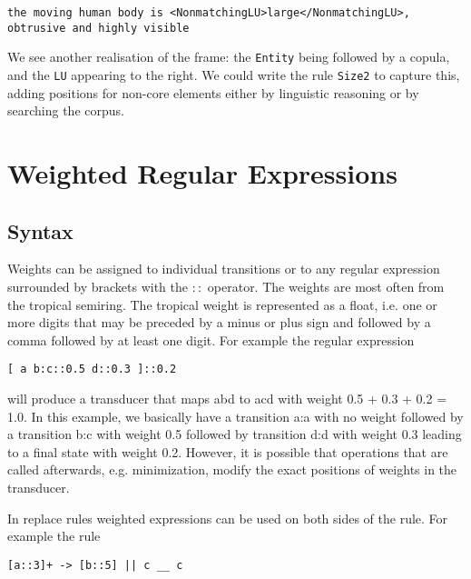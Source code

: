 \documentclass{llncs}
\begin{document}
\small
\begin{framed}
\begin{verbatim}
the moving human body is <NonmatchingLU>large</NonmatchingLU>,
obtrusive and highly visible
\end{verbatim}
\end{framed}
\normalsize

We see another realisation of the frame: the \verb+Entity+ being followed by a
copula, and the \verb+LU+ appearing to the right. We could write the rule
\verb+Size2+ to capture this, adding positions for non-core elements either by
linguistic reasoning or by searching the corpus.


\section{Weighted Regular Expressions}

\subsection{Syntax}

Weights can be assigned to individual transitions or to any regular expression surrounded by brackets
with the $::$ operator. The weights are most often from the tropical semiring. The tropical weight is
represented as a float, i.e. one or more digits that may be preceded by a minus or plus sign and followed
by a comma followed by at least one digit. For example the regular expression

\begin{framed}
\begin{verbatim}
[ a b:c::0.5 d::0.3 ]::0.2
\end{verbatim}
\end{framed}

will produce a transducer that maps abd to acd with weight 0.5 + 0.3 + 0.2 = 1.0. In this example,
we basically have a transition a:a with no weight followed by a transition b:c with weight 0.5
followed by transition d:d with weight 0.3 leading to a final state with weight 0.2. However, it is
possible that operations that are called afterwards, e.g. minimization, modify the exact positions
of weights in the transducer. 

In replace rules weighted expressions can be used on both sides of the rule.
For example the rule

\begin{framed}
\begin{verbatim}
[a::3]+ -> [b::5] || c __ c
\end{verbatim}
\end{framed}
\end{document}
